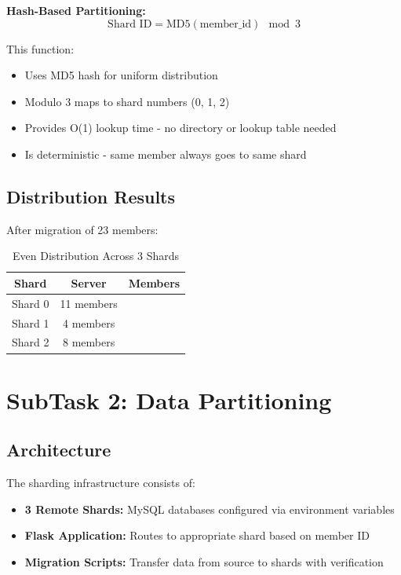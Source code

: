 \documentclass[12pt,a4paper]{article}
\begin{document}
\textbf{Hash-Based Partitioning:}
\[
\text{Shard ID} = \text{MD5}(\text{member\_id}) \mod 3
\]

This function:
\begin{itemize}
    \item Uses MD5 hash for uniform distribution
    \item Modulo 3 maps to shard numbers (0, 1, 2)
    \item Provides O(1) lookup time - no directory or lookup table needed
    \item Is deterministic - same member always goes to same shard
\end{itemize}

\subsection{Distribution Results}

After migration of 23 members:

\begin{table}[H]
\centering
\begin{tabularx}{\textwidth}{|c|c|c|}
\hline
\textbf{Shard} & \textbf{Server} & \textbf{Members} \\
\hline
Shard 0 & 11 members \\
Shard 1 & 4 members \\
Shard 2 & 8 members \\
\hline
\end{tabularx}
\caption{Even Distribution Across 3 Shards}
\end{table}

\section{SubTask 2: Data Partitioning}

\subsection{Architecture}

The sharding infrastructure consists of:

\begin{itemize}
    \item \textbf{3 Remote Shards:} MySQL databases configured via environment variables
    \item \textbf{Flask Application:} Routes to appropriate shard based on member ID
    \item \textbf{Migration Scripts:} Transfer data from source to shards with verification
\end{itemize}
\end{document}
